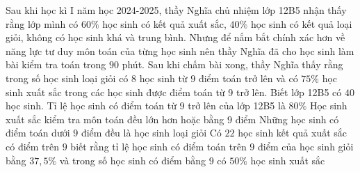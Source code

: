 \begin{ex}%
	Sau khi học kì I năm học 2024-2025, thầy Nghĩa chủ nhiệm lớp 12B5 nhận thấy rằng lớp mình có $60\%$ học sinh có kết quả xuất sắc, $40\%$ học sinh có kết quả loại giỏi, không có học sinh khá và trung bình. Nhưng để nắm bắt chính xác hơn về năng lực tư duy môn toán của từng học sinh nên thầy Nghĩa đã cho học sinh làm bài kiểm tra toán trong $90$ phút. Sau khi chấm bài xong, thầy Nghĩa thấy rằng trong số học sinh loại giỏi có $8$ học sinh từ $9$ điểm toán trở lên và có $75\%$ học sinh xuất sắc trong các học sinh được điểm toán từ 9 trở lên. Biết lớp 12B5 có $40$ học sinh.
	\choiceTF
	{\True Tỉ lệ học sinh có điểm toán từ $9$ trở lên của lớp 12B5 là $80\%$}
	{\True Học sinh xuất sắc kiểm tra môn toán đều lớn hơn hoặc bằng $9$ điểm}
	{\True Những học sinh có điểm toán dưới $9$ điểm đều là học sinh loại giỏi}
	{\True Có $22$ học sinh kết quả xuất sắc có điểm trên $9$ biết rằng tỉ lệ học sinh có điểm toán trên $9$ điểm của học sinh giỏi bằng $37{,}5\%$ và trong số học sinh có điểm bằng $9$ có $50\%$ học sinh xuất sắc}
\end{ex}


